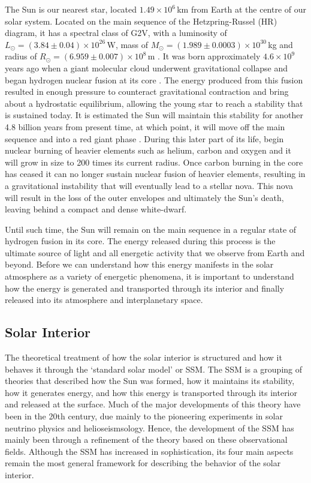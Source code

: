 The Sun is our nearest star, located $1.49\times10^6$\,km from Earth at the centre of our solar system. Located on the main sequence of the Hetzpring-Russel (HR) diagram, it has a spectral class of G2V, with a luminosity of $L_{\odot}=(3.84\pm 0.04)\times10^{26}$\,W, mass of $M_{\odot}=(1.989\pm0.0003)\times10^{30}$\,kg and radius of $R_{\odot}=(6.959\pm0.007)\times10^8$\,m \citep{foukal2004}. It was born approximately $4.6 \times 10^9$\,years ago when a giant molecular cloud underwent gravitational collapse and began hydrogen nuclear fusion at its core \citep{montmerle2006, bouvier2010}. The energy produced from this fusion resulted in enough pressure to counteract gravitational contraction and bring about a hydrostatic equilibrium, allowing the young star to reach a stability that is sustained today. It is estimated the Sun will maintain this stability for another 4.8 billion years from present time, at which point, it will move off the main sequence and into a red giant phase \citep{sackmann1993}. During this later part of its life, begin nuclear burning of heavier elements such as helium, carbon and oxygen and it will grow in size to 200 times its current radius. Once carbon burning in the core has ceased it can no longer sustain nuclear fusion of heavier elements, resulting in a gravitational instability that will eventually lead to a stellar nova. This nova will result in the loss of the outer envelopes and ultimately the Sun's death, leaving behind a compact and dense white-dwarf.

Until such time, the Sun will remain on the main sequence in a regular state of hydrogen fusion in its core. The energy released during this process is the ultimate source of light and all energetic activity that we observe from Earth and beyond. Before we can understand how this energy manifests in the solar atmosphere as a variety of energetic phenomena, it is important to understand how the energy is generated and transported through its interior and finally released into its atmosphere and interplanetary space.

\subsection{Solar Interior}\label{sec:10}

The theoretical treatment of how the solar interior is structured and how it behaves it through the \textquoteleft standard solar model' or SSM. The SSM is a grouping of theories that described how the Sun was formed, how it maintains its stability, how it generates energy, and how this energy is transported through its interior and released at the surface. Much of the major developments of this theory have been in the 20th century, due mainly to the pioneering experiments in solar neutrino physics and helioseismsology. Hence, the development of the SSM has mainly been through a refinement of the theory based on these observational fields. Although the SSM has increased in sophistication, its four main aspects remain the most general framework for describing the behavior of the solar interior.

